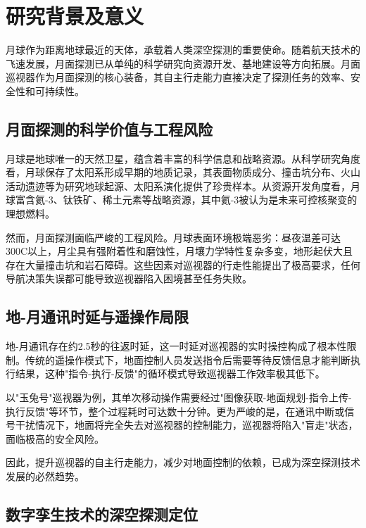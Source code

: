\section{研究背景及意义}
\label{section:1.1}

月球作为距离地球最近的天体，承载着人类深空探测的重要使命。随着航天技术的飞速发展，月面探测已从单纯的科学研究向资源开发、基地建设等方向拓展。月面巡视器作为月面探测的核心装备，其自主行走能力直接决定了探测任务的效率、安全性和可持续性。

\subsection{月面探测的科学价值与工程风险}
\label{section:1.1.1}

月球是地球唯一的天然卫星，蕴含着丰富的科学信息和战略资源。从科学研究角度看，月球保存了太阳系形成早期的地质记录，其表面物质成分、撞击坑分布、火山活动遗迹等为研究地球起源、太阳系演化提供了珍贵样本\cite{ref1}。从资源开发角度看，月球富含氦-3、钛铁矿、稀土元素等战略资源，其中氦-3被认为是未来可控核聚变的理想燃料\cite{ref2}。

然而，月面探测面临严峻的工程风险。月球表面环境极端恶劣：昼夜温差可达300\degree C以上，月尘具有强附着性和磨蚀性，月壤力学特性复杂多变，地形起伏大且存在大量撞击坑和岩石障碍\cite{ref3}。这些因素对巡视器的行走性能提出了极高要求，任何导航决策失误都可能导致巡视器陷入困境甚至任务失败。

\subsection{地-月通讯时延与遥操作局限}
\label{subsec:comm_delay}

地-月通讯存在约2.5秒的往返时延，这一时延对巡视器的实时操控构成了根本性限制。传统的遥操作模式下，地面控制人员发送指令后需要等待反馈信息才能判断执行结果，这种"指令-执行-反馈"的循环模式导致巡视器工作效率极其低下。

以"玉兔号"巡视器为例，其单次移动操作需要经过"图像获取-地面规划-指令上传-执行反馈"等环节，整个过程耗时可达数十分钟\cite{ref4}。更为严峻的是，在通讯中断或信号干扰情况下，地面将完全失去对巡视器的控制能力，巡视器将陷入"盲走"状态，面临极高的安全风险。

因此，提升巡视器的自主行走能力，减少对地面控制的依赖，已成为深空探测技术发展的必然趋势。

\subsection{数字孪生技术的深空探测定位}
\label{subsec:dt_position}

